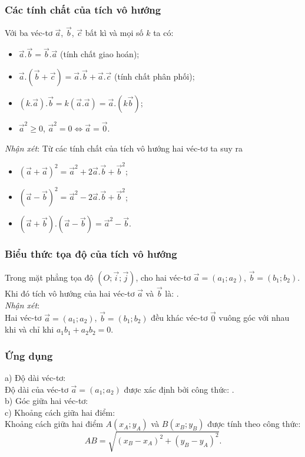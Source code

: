 \subsubsection{Các tính chất của tích vô hướng}
\begin{tc}
	Với ba véc-tơ $\vec{a}$, $\vec{b}$, $\vec{c}$ bất kì và mọi số $k$ ta có:
	\begin{itemize}
		\item $\vec{a}.\vec{b}=\vec{b}.\vec{a}$ (tính chất giao hoán);
		\item $\vec{a}.(\vec{b}+\vec{c})=\vec{a}.\vec{b}+\vec{a}.\vec{c}$ (tính chất phân phối);
		\item $(k.\vec{a}).\vec{b}=k(\vec{a}.\vec{a})=\vec{a}.(k\vec{b})$;
		\item $\vec{a}^2\geq0$, $\vec{a}^2=0\Leftrightarrow \vec{a}=\vec{0}$.
	\end{itemize}
\end{tc}
\textit{Nhận xét}: Từ các tính chất của tích vô hướng hai véc-tơ ta suy ra
\begin{itemize}
	\item $(\vec{a}+\vec{a})^2=\vec{a}^2+2\vec{a}.\vec{b}+\vec{b}^2$;
	\item $(\vec{a}-\vec{b})^2=\vec{a}^2-2\vec{a}.\vec{b}+\vec{b}^2$;
	\item $(\vec{a}+\vec{b}).(\vec{a}-\vec{b})=\vec{a}^2-\vec{b}$.
\end{itemize}
\subsubsection{Biểu thức tọa độ của tích vô hướng}
Trong mặt phẳng tọa độ $(O;\vec{i};\vec{j})$, cho hai véc-tơ $\vec{a}=(a_1;a_2)$, $\vec{b}=(b_1;b_2)$. Khi đó tích vô hướng của hai véc-tơ $\vec{a}$ và $\vec{b}$ là:
.\\
\textit{Nhận xét}:\\ Hai véc-tơ $\vec{a}=(a_1;a_2)$, $\vec{b}=(b_1;b_2)$ đều khác véc-tơ $\vec{0}$ vuông góc với nhau khi và chỉ khi $a_1b_1+a_2b_2=0$.
\subsubsection{Ứng dụng}
a) Độ dài véc-tơ:\\
Độ dài của véc-tơ $\vec{a}=(a_1;a_2)$ được xác định bởi công thức: .\\
b) Góc giữa hai véc-tơ: 
\\
c) Khoảng cách giữa hai điểm:\\
Khoảng cách giữa hai điểm $A(x_A;y_A)$ và $B(x_B;y_B)$ được tính theo công thức:
$$AB=\sqrt{(x_B-x_A)^2+(y_B-y_A)^2}.$$

